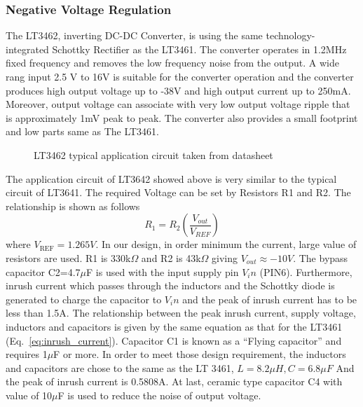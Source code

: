 \subsubsection{Negative Voltage Regulation}
The LT3462, inverting DC-DC Converter, is using the same technology- integrated Schottky Rectifier as the LT3461. The converter operates in 1.2MHz fixed frequency and removes the low frequency noise from the output.  A wide rang input 2.5 V to 16V is suitable for the converter operation and the converter produces high output voltage up to -38V and high output current up to 250mA. Moreover, output voltage can associate with very low output voltage ripple that is approximately 1mV peak to peak. The converter also provides a small footprint and low parts same as The LT3461.
\begin{figure}[!tbh]
	\centering
	\caption{LT3462 typical application circuit taken from datasheet\cite{LT3462_datasheet}}
	\label{fig:LT3462}
\end{figure}
The application circuit of LT3642 showed above is very similar to the typical circuit of LT3641. The required Voltage can be set by Resistors R1 and R2. The relationship is shown as follows
\begin{equation}
R_1 = R_2 \left( \frac{V_{out}}{V_{REF}} \right)
\label{eq:LM3462}
\end{equation}
where $V_\textrm{REF}=1.265V$. In our design, in order minimum the current, large value of resistors are used. R1 is 330k$\Omega$ and R2 is 43k$\Omega$ giving $V_{out} \approx -10V$. The bypass capacitor C2=4.7$\mu$F is used with the input supply pin $V_in$ (PIN6). Furthermore, inrush current which passes through the inductors and the Schottky diode is generated to charge the capacitor to $V_in$ and the peak of inrush current has to be less than 1.5A. The relationship between the peak inrush current, supply voltage, inductors and capacitors is given by the same equation as that for the LT3461 (Eq.~\ref{eq:inrush_current}). Capacitor C1 is known as a ``Flying capacitor'' and requires 1$\mu$F or more. In order to meet those design requirement, the inductors and capacitors are chose to the same as the LT 3461, $L=8.2\mu H, C=6.8\mu F$ And the peak of inrush current is 0.5808A. At last, ceramic type capacitor C4 with value of 10$\mu$F is used to reduce the noise of output voltage.
